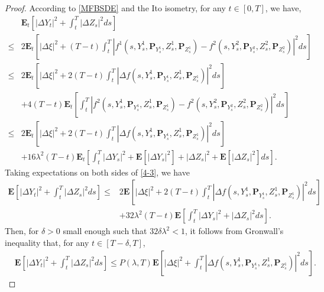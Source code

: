 \documentclass[10pt,a4paper]{amsart}
\def \E{\mathbf{E}}
\def \P{\mathbf{P}}
\begin{document}
\begin{proof}
 According to \eqref{MFBSDE} and the Ito isometry, for any $t\in[0,T]$, we have,
 \begin{equation}
     \begin{split}\label{4-3}
        &\E_t\left[\left|\Delta Y_t\right|^2+\int_{t}^{T}\left|\Delta Z_s\right|^2 ds\right]\\
        \leq& 2\E_t\left[\left|\Delta\xi\right|^2+(T-t)\int_{t}^{T}\left| f^1(s,Y_s^1,\P_{Y_s^1},Z_s^1,\P_{Z_s^1})-f^2(s,Y_s^2,\P_{Y_s^2},Z_s^2,\P_{Z_s^2})\right|^2ds\right]\\
        \leq& 2\E_t\left[\left|\Delta\xi\right|^2+2(T-t)\int_{t}^{T}\left|\Delta f(s,Y_s^1,\P_{Y_s^1},Z_s^1,\P_{Z_s^1})\right|^2ds\right]\\
        &+4(T-t)\E_t\left[\int_{t}^{T}\left| f^2(s,Y_s^1,\P_{Y_s^1},Z_s^1,\P_{Z_s^1})-f^2(s,Y_s^2,\P_{Y_s^2},Z_s^2,\P_{Z_s^2})\right|^2ds\right]\\
         \leq& 2\E_t\left[\left|\Delta\xi\right|^2+2(T-t)\int_{t}^{T}\left|\Delta f(s,Y_s^1,\P_{Y_s^1},Z_s^1,\P_{Z_s^1})\right|^2ds\right]\\
        &+16\lambda^2(T-t)\E_t\left[\int_{t}^{T}\left|\Delta Y_s\right|^2+\E\left[\left|\Delta Y_s\right|^2\right]+ \left|\Delta Z_s\right|^2+ \E\left[\left|\Delta Z_s\right|^2\right]ds\right].
     \end{split}
 \end{equation}
 Taking expectations on both sides of \eqref{4-3}, we have 
 \begin{equation*}
     \begin{split}\label{4-4}
        \E\left[\left|\Delta Y_t\right|^2+\int_{t}^{T}\left|\Delta Z_s\right|^2 ds\right]
         \leq& 2\E\left[\left|\Delta\xi\right|^2+2(T-t)\int_{t}^{T}\left|\Delta f(s,Y_s^1,\P_{Y_s^1},Z_s^1,\P_{Z_s^1})\right|^2ds\right]\\
        &+32\lambda^2(T-t)\E\left[\int_{t}^{T}\left|\Delta Y_s\right|^2+\left|\Delta Z_s\right|^2ds\right].
     \end{split}
 \end{equation*}
 Then, for $\delta>0$ small enough such that $32\delta \lambda^2<1$, it follows from Gronwall's inequality that, for any $t\in[T-\delta,T]$,
 \begin{equation}
     \begin{split}\label{4-5}
        &\E\left[\left|\Delta Y_t\right|^2+\int_{t}^{T}\left|\Delta Z_s\right|^2 ds\right]\leq P(\lambda,T)\E\left[\left|\Delta\xi\right|^2+\int_{t}^{T}\left|\Delta f(s,Y_s^1,\P_{Y_s^1},Z_s^1,\P_{Z_s^1})\right|^2ds\right].

\end{split}
\end{equation}
\end{proof}
\end{document}
